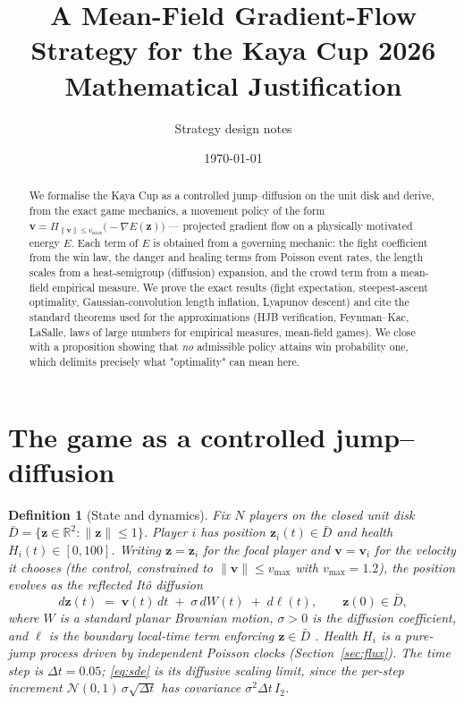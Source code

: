 \documentclass[11pt]{article}
\title{\textbf{A Mean-Field Gradient-Flow Strategy for the Kaya Cup 2026}\\[4pt]
\large Mathematical Justification}
\author{Strategy design notes}
\date{\today}
\newtheorem{definition}[theorem]{Definition}
\newcommand{\R}{\mathbb{R}}
\newcommand{\vmax}{v_{\max}}
\newcommand{\z}{\mathbf{z}}
\newcommand{\vv}{\mathbf{v}}
\newcommand{\normal}{\mathcal{N}}
\begin{document}
\maketitle

\begin{abstract}
We formalise the Kaya Cup as a controlled jump--diffusion on the unit disk and
derive, from the exact game mechanics, a movement policy of the form
$\vv = \Pi_{\|\vv\|\le \vmax}\!\big(-\nabla E(\z)\big)$ --- projected gradient
flow on a physically motivated energy $E$. Each term of $E$ is obtained from a
governing mechanic: the fight coefficient from the win law, the danger and
healing terms from Poisson event rates, the length scales from a heat-semigroup
(diffusion) expansion, and the crowd term from a mean-field empirical measure.
We prove the exact results (fight expectation, steepest-ascent optimality,
Gaussian-convolution length inflation, Lyapunov descent) and cite the standard
theorems used for the approximations (HJB verification, Feynman--Kac, LaSalle,
laws of large numbers for empirical measures, mean-field games). We close with a
proposition showing that \emph{no} admissible policy attains win probability
one, which delimits precisely what "optimality" can mean here.
\end{abstract}

\tableofcontents
\newpage

\section{The game as a controlled jump--diffusion}

\begin{definition}[State and dynamics]\label{def:state}
Fix $N$ players on the closed unit disk $\bar D=\{\z\in\R^2:\|\z\|\le 1\}$.
Player $i$ has position $\z_i(t)\in\bar D$ and health $H_i(t)\in[0,100]$. Writing
$\z=\z_i$ for the focal player and $\vv=\vv_i$ for the velocity it chooses
(the \emph{control}, constrained to $\|\vv\|\le\vmax$ with $\vmax=1.2$), the
position evolves as the reflected It\^o diffusion
\begin{equation}\label{eq:sde}
  d\z(t) \;=\; \vv(t)\,dt \;+\; \sigma\, dW(t) \;+\; d\boldsymbol{\ell}(t),
  \qquad \z(0)\in\bar D,
\end{equation}
where $W$ is a standard planar Brownian motion, $\sigma>0$ is the diffusion
coefficient, and $\boldsymbol{\ell}$ is the boundary local-time term enforcing
$\z\in\bar D$ \cite{Oksendal}. Health $H_i$ is a pure-jump process driven by
independent Poisson clocks (Section~\ref{sec:flux}). The time step is
$\Delta t=0.05$; \eqref{eq:sde} is its diffusive scaling limit, since the
per-step increment $\normal(0,1)\,\sigma\sqrt{\Delta t}$ has covariance
$\sigma^2\Delta t\,I_2$.
\end{definition}
\end{document}
